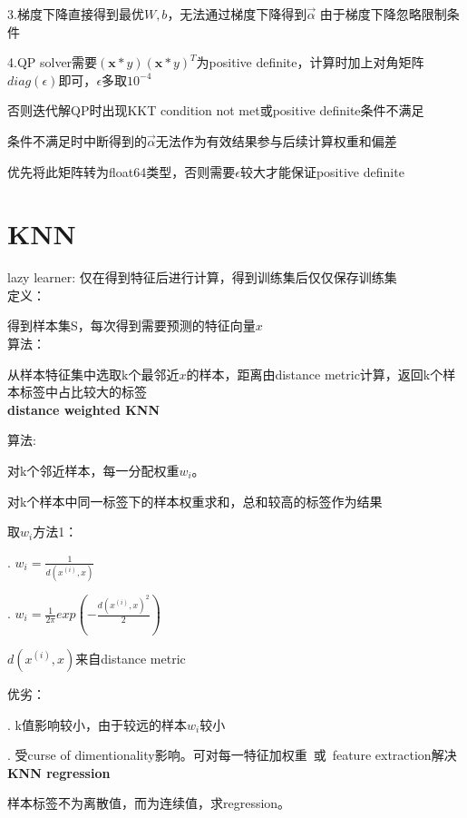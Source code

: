\documentclass[UTF8]{ctexart}
\begin{document}
  \quad \quad 3.梯度下降直接得到最优$W, b$，无法通过梯度下降得到$\vec{\alpha}$ 由于梯度下降忽略限制条件

  \quad \quad 4.QP solver需要$(\mathbf{x} * y)(\mathbf{x} * y)^T$为positive definite，计算时加上对角矩阵$diag(\epsilon)$即可，$\epsilon$多取$10^{-4}$

  \quad \quad \quad 否则迭代解QP时出现KKT condition not met或positive definite条件不满足

  \quad \quad \quad 条件不满足时中断得到的$\vec{\alpha}$无法作为有效结果参与后续计算权重和偏差

  \quad \quad \quad 优先将此矩阵转为float64类型，否则需要$\epsilon$较大才能保证positive definite
  
\section{KNN}
\noindent lazy learner: 仅在得到特征后进行计算，得到训练集后仅仅保存训练集\\
  定义：

  \quad 得到样本集S，每次得到需要预测的特征向量$x$\\
  算法：

  \quad 从样本特征集中选取k个最邻近$x$的样本，距离由distance metric计算，返回k个样本标签中占比较大的标签\\
\textbf{distance weighted KNN}

  算法:

  \quad 对k个邻近样本，每一分配权重$w_i$。

  \quad 对k个样本中同一标签下的样本权重求和，总和较高的标签作为结果

  取$w_i$方法1：

  . $w_i = \frac{1}{d(x^{(i)}, x)}$

  . $w_i = \frac{1}{2\pi} exp(-\frac{d(x^{(i)}, x)^2}{2})$

  \quad $d(x^{(i)}, x)$来自distance metric

  优劣：

  . k值影响较小，由于较远的样本$w_i$较小

  . 受curse of dimentionality影响。可对每一特征加权重\ 或\ feature extraction解决\\
\textbf{KNN regression}

  样本标签不为离散值，而为连续值，求regression。
\end{document}
